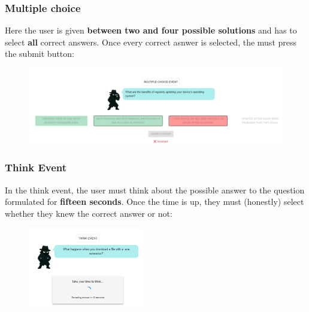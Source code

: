 \subsubsection{Multiple choice}\label{qt:multiple}
Here the user is given \textbf{between two and four possible solutions} and has to select \textbf{all} correct answers. Once every
correct asnwer is selected, the must press the submit button:
\begin{figure}[htbp]
    \centering
    \includegraphics[width=1\textwidth]{images/Multiple_Choice.png}
\end{figure}

\subsubsection{Think Event}\label{qt:think}
In the think event, the user must think about the possible answer to the question formulated for \textbf{fifteen seconds}. Once the
time is up, they must (honestly) select whether they knew the correct answer or not:
\begin{figure}[htbp]
    \centering
    \includegraphics[width=0.45\textwidth]{images/Think_Event.png}
    \hfill
\end{figure}
\pagebreak

